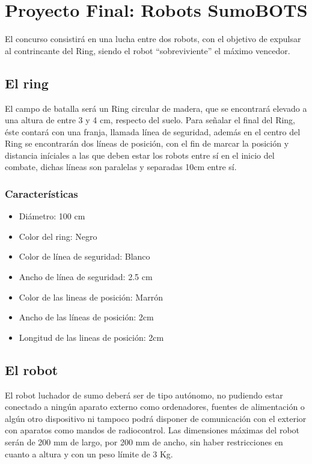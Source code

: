 \documentclass[12pt]{book}
\theoremstyle{definition}
\theoremstyle{remark}
\theoremstyle{plain}
\begin{document}
 \section{Proyecto Final: Robots SumoBOTS }
El concurso consistirá en una lucha entre dos robots, con el objetivo de expulsar al contrincante del Ring, siendo el robot “sobreviviente” el máximo vencedor. 

\subsection{El ring}
El campo de batalla será un Ring circular de madera, que se encontrará elevado a una altura de entre 3 y 4 cm, respecto del suelo. 
Para señalar el final del Ring, éste contará con una franja, llamada línea de seguridad, además en el centro del Ring se encontrarán 
dos líneas de posición, con el fin de marcar la posición y distancia iníciales a las que deben estar los robots entre sí en el inicio 
del combate, dichas líneas son paralelas y separadas 10cm entre sí.

\subsubsection{Características}
\begin{itemize}
 \item Diámetro: 100 cm
 \item Color del ring: Negro
 \item Color de línea de seguridad: Blanco
 \item Ancho de línea de seguridad: 2.5 cm
 \item Color de las lineas de posición: Marrón
 \item Ancho de las líneas de posición: 2cm
 \item Longitud de las lineas de posición: 2cm
\end{itemize}

\subsection{El robot}

El robot luchador de sumo deberá ser de tipo autónomo, no pudiendo estar conectado a ningún aparato externo como ordenadores, 
fuentes de alimentación o algún otro dispositivo ni tampoco podrá disponer de comunicación con el exterior con aparatos como
 mandos de radiocontrol. Las dimensiones máximas del robot serán de 200 mm de largo, por 200 mm de ancho, sin haber 
restricciones en cuanto a altura y con un peso límite de 3 Kg.
\end{document}
